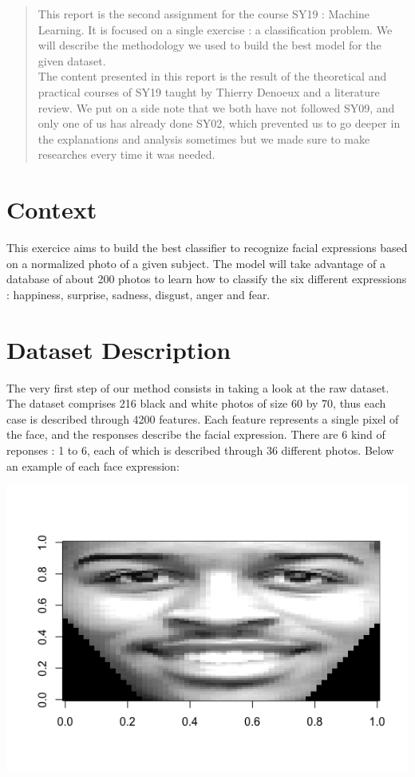 \documentclass[]{report}
\begin{document}
\begin{abstract}

	This report is the second assignment for the course SY19 : Machine Learning. It is focused on a single exercise : a classification problem. We will describe the methodology we used to build the best model for the given dataset.\\
	The content presented in this report is the result of the theoretical and practical courses of SY19 taught by Thierry Denoeux and a literature review. We put on a side note that we both have not followed SY09, and only one of us has already done SY02, which prevented us to go deeper in the explanations and analysis sometimes but we made sure to make researches every time it was needed.
	
\end{abstract}



\tableofcontents



\section{Context}
This exercice aims to build the best classifier to recognize facial expressions based on a normalized photo of a given subject. The model will take advantage of a database of about 200 photos to learn how to classify the six different expressions : happiness, surprise, sadness, disgust, anger and fear.

\section{Dataset Description}
The very first step of our method consists in taking a look at the raw dataset. The dataset comprises 216 black and white photos of size 60 by 70, thus each case is described through 4200 features. Each feature represents a single pixel of the face, and the responses describe the facial expression. There are 6 kind of reponses : 1 to 6, each of which is described through 36 different photos. Below an example of each face expression:


\begin{center}
	\includegraphics[width=0.6\linewidth]{Figures/happy_X32_y1.png}
	\label{fig:y=1}
\end{center}
\end{document}
